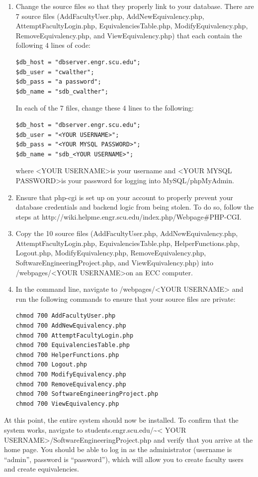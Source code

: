 \documentclass{article}
\begin{document}
\begin{enumerate}
\item Change the source files so that they properly link to your database.
There are 7 source files (AddFacultyUser.php, AddNewEquivalency.php,
AttemptFacultyLogin.php, EquivalenciesTable.php, ModifyEquivalency.php,
RemoveEquivalency.php, and ViewEquivalency.php) that each contain the following 4
lines of code:
\begin{lstlisting}
$db_host = "dbserver.engr.scu.edu";
$db_user = "cwalther";
$db_pass = "a password";
$db_name = "sdb_cwalther";
\end{lstlisting}
In each of the 7 files, change these 4 lines to the following:
\begin{lstlisting}
$db_host = "dbserver.engr.scu.edu";
$db_user = "<YOUR USERNAME>";
$db_pass = "<YOUR MYSQL PASSWORD>";
$db_name = "sdb_<YOUR USERNAME>";
\end{lstlisting}
where \textless YOUR USERNAME\textgreater  is your username and \textless YOUR
MYSQL PASSWORD\textgreater  is your
password for logging into MySQL/phpMyAdmin.
\item Ensure that php-cgi is set up on your account to properly prevent your
database credentials and backend logic from being stolen.  To do so, follow the
steps at \newline http://wiki.helpme.engr.scu.edu/index.php/Webpage\#PHP-CGI.
\item Copy the 10 source files
(AddFacultyUser.php, AddNewEquivalency.php, AttemptFacultyLogin.php,
EquivalenciesTable.php, HelperFunctions.php, Logout.php, ModifyEquivalency.php,
RemoveEquivalency.php, SoftwareEngineeringProject.php, and ViewEquivalency.php)
into /webpages/\textless YOUR USERNAME\textgreater  on an ECC computer.
\item In the command line, navigate to /webpages/\textless YOUR USERNAME\textgreater
and run the
following commands to ensure that your source files are private:
\begin{lstlisting}
chmod 700 AddFacultyUser.php
chmod 700 AddNewEquivalency.php
chmod 700 AttemptFacultyLogin.php
chmod 700 EquivalenciesTable.php
chmod 700 HelperFunctions.php
chmod 700 Logout.php
chmod 700 ModifyEquivalency.php
chmod 700 RemoveEquivalency.php
chmod 700 SoftwareEngineeringProject.php
chmod 700 ViewEquivalency.php
\end{lstlisting}
\end{enumerate}

\par At this point, the entire system should now be installed. To confirm that
the system works, navigate to students.engr.scu.edu/\textasciitilde \textless
YOUR USERNAME\textgreater /SoftwareEngineeringProject.php and verify that you
arrive at the home page.  You should be able to log in as the administrator
(username is ``admin'', password is ``password''), which will allow you to
create faculty users and create equivalencies.
\end{document}
